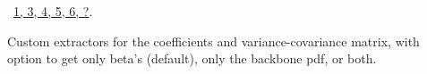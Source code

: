 \documentclass[reqno]{amsart}
\renewcommand{\NWlink}[2]{\hyperlink{#1}{#2}}
\begin{document}
\begin{flushleft}
\begin{list}{}{}
\mbox{}\verb@        q0 <- x$f0@\\
\mbox{}\verb@         print.default(format(q0, digits = digits),@\\
\mbox{}\verb@            print.gap = 2, quote = FALSE)@\\
\mbox{}\verb@    }@\\
\mbox{}\verb@    else cat("No baseline joint probabilities\n")@\\
\mbox{}\verb@@\\
\mbox{}\verb@   cat("\n Log-likelihood: ", format(x$loglik, digits=digits), "\n")@\\
\mbox{}\verb@   invisible(x)@\\
\mbox{}\verb@}@\\
\mbox{}\verb@@{\NWsep}
\end{list}
\vspace{-1.5ex}
\footnotesize
\begin{list}{}{\setlength{\itemsep}{-\parsep}\setlength{\itemindent}{-\leftmargin}}
\item \NWtxtFileDefBy\ \NWlink{nuweb1}{1}\NWlink{nuweb3}{, 3}\NWlink{nuweb4}{, 4}\NWlink{nuweb5}{, 5}\NWlink{nuweb6}{, 6}\NWlink{nuweb?}{, ?}.

\item{}
\end{list}
\vspace{4ex}
\end{flushleft}
Custom extractors for the coefficients and variance-covariance matrix, with option to get only beta's (default), only the backbone pdf, or both.
\end{document}

